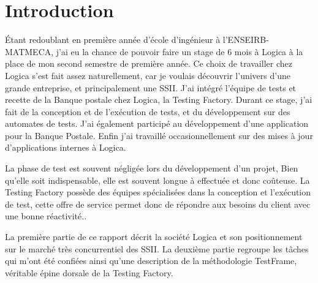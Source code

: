 \chapter{Introduction}

Étant redoublant en première année d'école d'ingénieur à l'ENSEIRB-MATMECA, j'ai eu la chance de pouvoir faire un stage de 6 mois à Logica à la place de mon second semestre de première année. Ce choix de travailler chez Logica s'est fait assez naturellement, car je voulais découvrir l'univers d'une grande entreprise, et principalement une SSII. J'ai intégré l'équipe de tests et recette de la Banque postale chez Logica, la Testing Factory. Durant ce stage, j'ai fait de la conception et de l'exécution de tests, et du développement sur des automates de tests. J'ai également participé au développement d'une application pour la Banque Postale. Enfin j'ai travaillé occasionnellement sur des mises à jour d'applications internes à Logica.

La phase de test est souvent négligée lors du développement d'un projet, Bien qu'elle soit indispensable, elle est  souvent longue à effectuée et donc coûteuse. La Testing Factory possède des équipes spécialisées dans la conception et l'exécution de test, cette offre de service permet donc de répondre aux besoins du client avec une bonne réactivité..

La première partie de ce rapport décrit la société Logica et son positionnement sur le marché très concurrentiel des SSII. La deuxième partie regroupe les tâches qui m'ont été confiées ainsi qu'une description de la méthodologie TestFrame, véritable épine dorsale de la Testing Factory.


